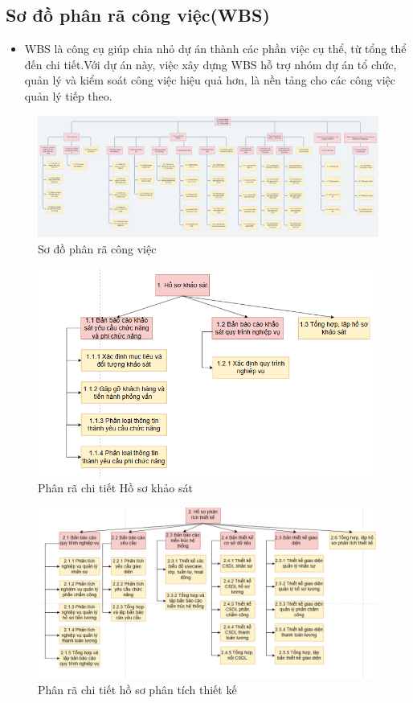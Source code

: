 \subsection{Sơ đồ phân rã công việc(WBS)}
\begin{itemize}
    \item WBS là công cụ giúp chia nhỏ dự án thành các phần việc cụ thể, từ tổng thể đến chi tiết.Với dự án này, việc xây dựng WBS hỗ trợ nhóm dự án tổ chức, quản lý và kiểm soát công việc hiệu quả hơn, là nền tảng cho các công việc quản lý tiếp theo.    
\end{itemize}
\begin{figure}[H]
    \centering
    \includegraphics[width=\textwidth]{images/sodophanratongquat.png}
    \caption{Sơ đồ phân rã công việc}
\end{figure}
\begin{figure}[H]
    \centering
    \includegraphics[width=\textwidth]{images/hskhaosat.png}
    \caption{Phân rã chi tiết Hồ sơ khảo sát}
\end{figure}
\begin{figure}[H]
    \centering
    \includegraphics[width=\textwidth]{images/hspttk.png}
    \caption{Phân rã chi tiết hồ sơ phân tích thiết kế}
\end{figure}
